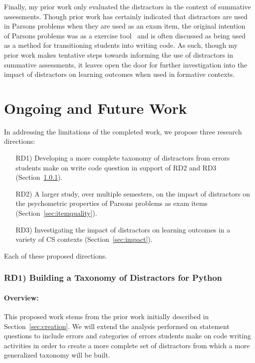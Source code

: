 \documentclass[authorversion,nonacm]{acmart}
\begin{document}
Finally, my prior work only evaluated the distractors in the context of
summative assessments. Though prior work has certainly indicated that
distractors are used in Parsons problems when they are used as an exam item,
the original intention of Parsons problems was as a exercise
tool~\cite{parsons2006parson} and is often discussed as being used as a method
for transitioning students into writing code. As such, though my prior work
makes tentative steps towards informing the use of distractors in summative
assessments, it leaves open the door for further investigation into the impact
of distractors on learning outcomes when used in formative contexts.

\section{Ongoing and Future Work}

In addressing the limitations of the completed work, we propose three research
directions:
\begin{enumerate}
  \item[RD1)] Developing a more complete taxonomy of distractors from errors
    students make on write code question in support of RD2 and RD3
    (Section~\ref{sec:taxonomy}).
  \item[RD2)] A larger study, over multiple semesters, on the impact of distractors on the psychometric
    properties of Parsons problems as exam items (Section~\ref{sec:itemquality}).
  \item[RD3)] Investigating the impact of distractors on learning outcomes in a
    variety of CS contexts (Section~\ref{sec:impact}).
\end{enumerate}
Each of these proposed directions. 

\subsubsection{RD1) Building a Taxonomy of Distractors for Python}\label{sec:taxonomy}

\paragraph{Overview:} 

This proposed work stems from the prior work initially described in
Section~\ref{sec:creation}. We will extend the analysis performed on statement
questions to include errors and categories of errors students make on code
writing activities in order to create a more complete set of distractors from
which a more generalized taxonomy will be built.  
\end{document}
